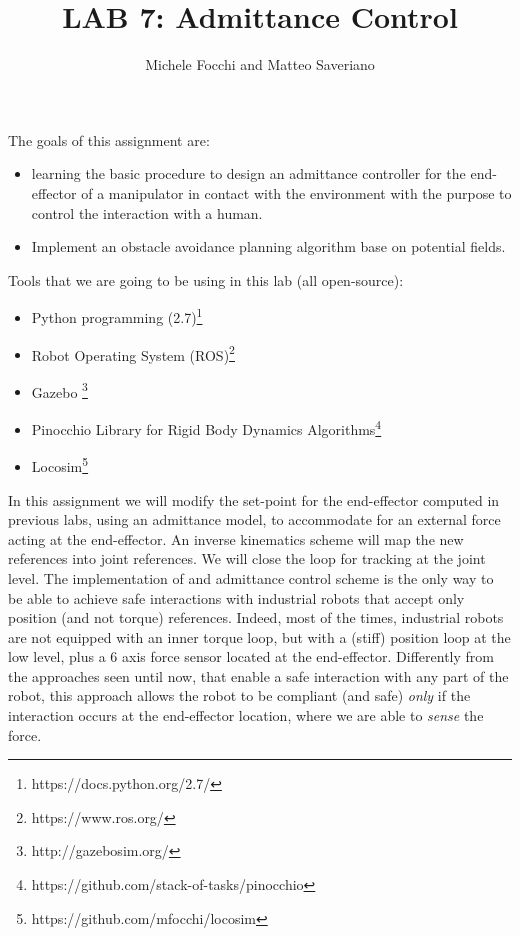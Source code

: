 \documentclass[11pt]{article}
\title{LAB 7: Admittance Control}
\author{Michele Focchi and Matteo Saveriano}
\date{}
\begin{document}
	\maketitle
	\noindent
	The goals of this assignment are:
	\begin{itemize}
		\item learning the basic procedure to design an admittance controller for the end-effector of a manipulator in contact with the environment with the purpose to control the interaction with a human.
		\item Implement an obstacle avoidance planning algorithm base on potential fields. 
	\end{itemize}
	
	\noindent
	Tools that we are going to be using in this lab (all open-source):
	\begin{itemize}
		\item Python programming (2.7)\footnote{https://docs.python.org/2.7/}
		\item Robot Operating System (ROS)\footnote{https://www.ros.org/}
		\item Gazebo \footnote{http://gazebosim.org/}
		\item Pinocchio Library for Rigid Body Dynamics Algorithms\footnote{https://github.com/stack-of-tasks/pinocchio}
		\item Locosim\footnote{https://github.com/mfocchi/locosim}
	\end{itemize}
	In this assignment we will modify the set-point for the end-effector computed in previous labs, using an admittance model, to accommodate for an external force acting at the end-effector. An inverse kinematics scheme will map the new references into joint references. We will close the loop for tracking at the joint level. The implementation of and admittance control scheme is the only way to be able to  achieve safe interactions with industrial robots that accept only position (and not torque) references. Indeed, most of the times, industrial robots are not equipped with an inner torque loop, but with a (stiff) position loop at the low level, plus a 6 axis force sensor located at the end-effector. Differently from the approaches seen until now, that enable a safe interaction with any part of the robot, this approach allows the robot to be compliant (and safe) \textit{only} if the interaction occurs at the end-effector location, where we are able to \textit{sense} the force. 
	
\end{document}
